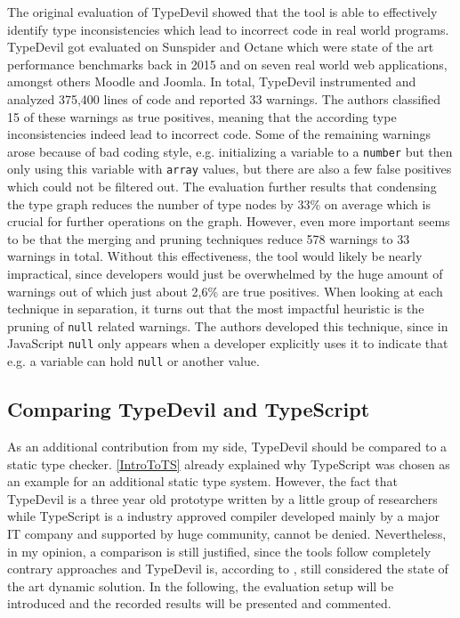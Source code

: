 \documentclass[runningheads,a4paper]{llncs}
\begin{document}
The original evaluation of TypeDevil showed that the tool is able to effectively identify type inconsistencies which lead to incorrect code in real world programs.
TypeDevil got evaluated on Sunspider and Octane which were state of the art performance benchmarks back in 2015 and on seven real world web applications, amongst others Moodle and Joomla.
In total, TypeDevil instrumented and analyzed 375,400 lines of code and reported 33 warnings.
The authors classified 15 of these warnings as true positives, meaning that the according type inconsistencies indeed lead to incorrect code.
Some of the remaining warnings arose because of bad coding style, e.g. initializing a variable to a \lstinline[columns=fixed]{number} but then only using this variable with \lstinline[columns=fixed]{array} values, but there are also a few false positives which could not be filtered out.
The evaluation further results that condensing the type graph reduces the number of type nodes by 33\% on average which is crucial for further operations on the graph.
However, even more important seems to be that the merging and pruning techniques reduce 578 warnings to 33 warnings in total.
Without this effectiveness, the tool would likely be nearly impractical, since developers would just be overwhelmed by the huge amount of warnings out of which just about 2,6\% are true positives. 
When looking at each technique in separation, it turns out that the most impactful heuristic is the pruning of \lstinline[columns=fixed]{null} related warnings. 
The authors developed this technique, since in JavaScript \lstinline[columns=fixed]{null} only appears when a developer explicitly uses it to indicate that e.g. a variable can hold \lstinline[columns=fixed]{null} or another value.

\subsection{Comparing TypeDevil and TypeScript} \label{comparison}
As an additional contribution from my side, TypeDevil should be compared to a static type checker.
\ref{IntroToTS} already explained why TypeScript was chosen as an example for an additional static type system.
However, the fact that TypeDevil is a three year old prototype written by a little group of researchers while TypeScript is a industry approved compiler developed mainly by a major IT company and supported by huge community, cannot be denied.
Nevertheless, in my opinion, a comparison is still justified, since the tools follow completely contrary approaches and TypeDevil is, according to \cite{DBLP:conf/icse/TanXCLYS17}, still considered the state of the art dynamic solution.
In the following, the evaluation setup will be introduced and the recorded results will be presented and commented. 
\end{document}
